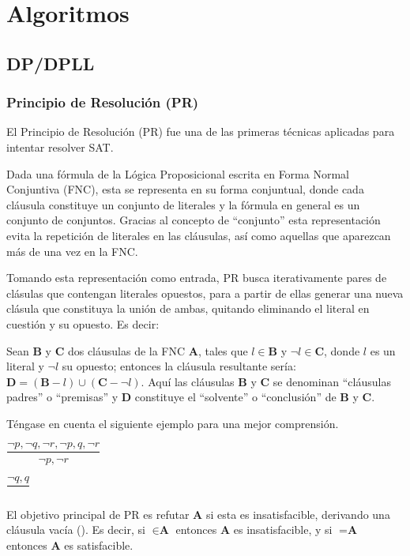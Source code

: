 \chapter{Algoritmos}\label{chapter:algorithms}

\section{DP/DPLL}

\subsection{Principio de Resolución (PR)}
El Principio de Resolución (PR) fue una de las primeras técnicas aplicadas para intentar resolver SAT.

Dada una fórmula de la Lógica Proposicional escrita en Forma Normal Conjuntiva (FNC), esta se representa en su forma conjuntual, donde cada cláusula constituye un conjunto de literales y la fórmula en general es un conjunto de conjuntos. Gracias al concepto de ``conjunto'' esta representación evita la repetición de literales en las cláusulas, así como aquellas que aparezcan más de una vez en la FNC. 

Tomando esta representación como entrada, PR busca iterativamente pares de clásulas que contengan literales opuestos, para a partir de ellas generar una nueva clásula que constituya la unión de ambas, quitando eliminando el literal en cuestión y su opuesto. Es decir:

Sean $\textbf{B}$ y $\textbf{C}$ dos cláusulas de la FNC $\textbf{A}$, tales que $l \in \textbf{B}$ y $\neg l \in \textbf{C}$, donde $l$ es un literal y $\neg l$ su opuesto; entonces la cláusula resultante sería: $\textbf{D} = (\textbf{B}-{l}) \cup (\textbf{C}-{\neg l})$. Aquí las cláusulas $\textbf{B}$ y $\textbf{C}$ se denominan ``cláusulas padres'' o ``premisas'' y $\textbf{D}$ constituye el ``solvente'' o ``conclusión'' de $\textbf{B}$ y $\textbf{C}$.

Téngase en cuenta el siguiente ejemplo para una mejor comprensión.

$\dfrac{{\neg p, \neg q, \neg r},{\neg p, q, \neg r}}{{\neg p, \neg r}}$

$\dfrac{{\neg q}, {q}}{{}}$

El objetivo principal de PR es refutar $\textbf{A}$ si esta es insatisfacible, derivando una cláusula vacía (${}$). Es decir, si ${} \in \textbf{A}$ entonces $\textbf{A}$ es insatisfacible, y si ${} = \textbf{A}$ entonces $\textbf{A}$ es satisfacible.

